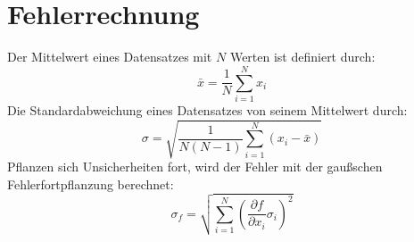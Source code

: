 \section{Fehlerrechnung}
\label{sec:Fehlerrechnung}
Der Mittelwert eines Datensatzes mit $N$ Werten ist definiert durch:
\begin{equation}
  \bar{x} = \frac{1}{N} \sum_{i=1}^N x_i
\end{equation}
Die Standardabweichung eines Datensatzes von seinem Mittelwert durch:
\begin{equation}
  \sigma = \sqrt{\frac{1}{N(N-1)} \sum_{i=1}^N (x_i - \bar{x})}
\end{equation}
Pflanzen sich Unsicherheiten fort, wird der Fehler mit der gaußschen
Fehlerfortpflanzung berechnet:
\begin{equation}
  \sigma_f = \sqrt{
      \sum\limits_{i = 1}^N
       \left( \frac{\partial f}{\partial x_i} \sigma_i \right)^{\!\! 2}
     }
\end{equation}
